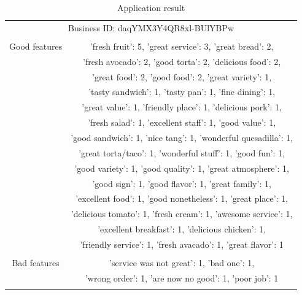 \newpage
\begin{table}[!h]
	\centering
	\tiny
	\caption{Application result}
	\begin{tabular}{c|c}
		\hline
		\multicolumn{2}{c}{Business ID: daqYMX3Y4QR8xl-BUlYBPw}\\
		\multicolumn{2}{c}{ }\\
		\hline
		Good features &'fresh fruit': 5, 'great service': 3, 'great bread': 2,\\
		&'fresh avocado': 2, 'good torta': 2, 'delicious food': 2,\\
		&'great food': 2, 'good food': 2, 'great variety': 1,\\
		&'tasty sandwich': 1, 'tasty pan': 1, 'fine dining': 1,\\
		&'great value': 1, 'friendly place': 1, 'delicious pork': 1,\\
		&'fresh salad': 1, 'excellent staff': 1, 'good value': 1,\\
		&'good sandwich': 1, 'nice tang': 1, 'wonderful quesadilla': 1,\\
		&'great torta/taco': 1, 'wonderful stuff': 1, 'good fun': 1,\\
		&'good variety': 1, 'good quality': 1, 'great atmosphere': 1,\\
		&'good sign': 1, 'good flavor': 1, 'great family': 1,\\
		&'excellent food': 1, 'good nonetheless': 1, 'great place': 1,\\
		&'delicious tomato': 1, 'fresh cream': 1, 'awesome service': 1,\\
		&'excellent breakfast': 1, 'delicious chicken': 1,\\
		&'friendly service': 1, 'fresh avacado': 1, 'great flavor': 1\\
		&\\
		\hline
		Bad features &'service was not great': 1, 'bad one': 1,\\
		&'wrong order': 1, 'are now no good': 1, 'poor job': 1\\
		&\\
		\hline
		
	\end{tabular}
\end{table}